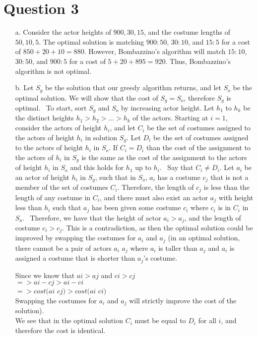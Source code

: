 \documentclass[12pt]{article}
\begin{document}
\section*{Question 3} 
\begin{enumerate}
    \item[a.] Consider the actor heights of $900, 30, 15$, and the costume lengths of $50, 10, 5$. The optimal solution is matching $900 : 50$, $30 : 10$, and $15 : 5$ for a cost of $850 + 20 + 10 = 880$. However, Bombazzino's algorithm will match $15 : 10$, $30 : 50$, and $900 : 5$ for a cost of $5 + 20 + 895 = 920$. Thus, Bombazzino's algorithm is not optimal.
    \item[b.] Let $S_g$ be the solution that our greedy algorithm returns, and let $S_o$ be the optimal solution. We will show that the cost of $S_g = S_o$, therefore $S_g$ is optimal.
    \newline \,
    \newline
    To start, sort $S_g$ and $S_o$ by increasing actor height. Let $h_1$ to $h_k$ be the distinct heights $h_1 > h_2 > ... > h_k$ of the actors. Starting at $i = 1$, consider the actors of height $h_i$, and let $C_i$ be the set of costumes assigned to the actors of height $h_i$ in solution $S_g$. Let $D_i$ be the set of costumes assigned to the actors of height $h_i$ in $S_o$. If $C_i = D_i$ than the cost of the assignment to the actors of $h_i$ in $S_g$ is the same as the cost of the assignment to the actors of height $h_i$ in $S_o$ and this holds for $h_1$ up to $h_i$.
    \newline \,
    \newline
    Say that $C_i \neq D_i$. Let $a_i$ be an actor of height $h_i$ in $S_g$, such that in $S_o$, $a_i$ has a costume $c_j$ that is not a member of the set of costumes $C_i$. Therefore, the length of $c_j$ is less than the length of any costume in $C_i$, and there must also exist an actor $a_j$ with height less than $h_i$ such that $a_j$ has been given some costume $c_i$ where $c_i$ is in $C_i$ in $S_o$.
    \newline \,
    \newline
    Therefore, we have that the height of actor $a_i > a_j$, and the length of costume $c_i > c_j$. This is a contradiction, as then the optimal solution could be improved by swapping the costumes for $a_i$ and $a_j$ 
    (in an optimal solution, there cannot be a pair of actors $a_i$ $a_j$ where $a_i$ is taller than $a_j$ and $a_i$ is assigned a costume that is shorter than $a_j$'s costume. 
    
    Since we know that $ai > aj$ and $ci > cj$\\
    $=> ai - cj > ai - ci$\\
    $=> cost(ai$ $cj) > cost(ai$ $ci)$\\
    
    Swapping the costumes for $a_i$ and $a_j$ will strictly improve the cost of the solution).\\

    We see that in the optimal solution $C_i$ must be equal to $D_i$ for all $i$, and therefore the cost is identical.

\end{enumerate}
\end{document}
